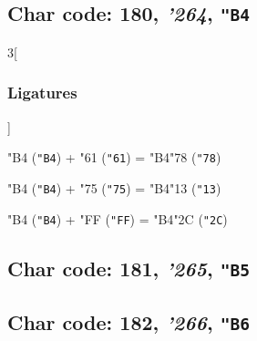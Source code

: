 \documentclass{article}
\newlength{\maxcharwidth}
\begin{document}
\subsection{Char code: 180, {\it'264}, {\tt"B4}}
\label{char_180}


\begin{multicols}{3}[\subsubsection{Ligatures}]

{\testfont\char"B4\noboundary} ({\tt"B4}) + {\testfont\char"61\noboundary} ({\tt"61}) = {\testfont\char"B4\noboundary}{\testfont\char"78\noboundary} ({\tt"78}) 

{\testfont\char"B4\noboundary} ({\tt"B4}) + {\testfont\char"75\noboundary} ({\tt"75}) = {\testfont\char"B4\noboundary}{\testfont\char"13\noboundary} ({\tt"13}) 

{\testfont\char"B4\noboundary} ({\tt"B4}) + {\testfont\char"FF\noboundary} ({\tt"FF}) = {\testfont\char"B4\noboundary}{\testfont\char"2C\noboundary} ({\tt"2C}) 

\end{multicols}

\subsection{Char code: 181, {\it'265}, {\tt"B5}}
\label{char_181}


\subsection{Char code: 182, {\it'266}, {\tt"B6}}
\label{char_182}
\end{document}
